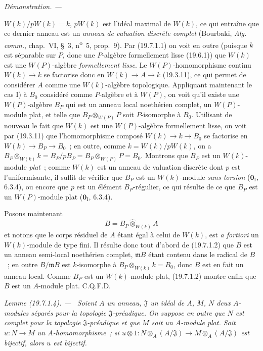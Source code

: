 \documentclass[10pt,oneside]{book}
\makeatletter
\newcommand{\setmanualcurrentlabel}[1]{\def\@currentlabel{#1}}
\newcommand{\oldpage}[2][]{%
  \setcounter{footnote}{0}%
  \marginpar{\scriptsize\textbf{#1}~|~#2}\ignorespaces}
\newenvironment{lemma}[1][]{%
  \setmanualcurrentlabel{#1}\par\medskip\noindent\itshape Lemme (#1). ---\ }{\par}
\newenvironment{proof}{%
  \par\medskip\noindent\textit{Démonstration. ---\ }}{\par}
\makeatother
\begin{document}
\begin{proof}
\oldpage[0\textsubscript{IV-1}]{107}

$W(k)/pW(k)=k$, $pW(k)$ est l'idéal maximal de $W(k)$, ce qui entraîne que ce
dernier anneau est un \emph{anneau de valuation discrète complet} (Bourbaki,
\emph{Alg. comm.}, chap.~VI, §~3, n\textsuperscript{o}~5, prop.~9). Par
(19.7.1.1) on voit en outre (puisque $k$ est séparable sur $P$, donc une
$P$-algèbre formellement lisse (19.6.1)) que $W(k)$ est une $W(P)$-algèbre
\emph{formellement lisse}. Le $W(P)$-homomorphisme continu $W(k)\to k$ se
factorise donc en $W(k)\to A\to k$ (19.3.11), ce qui permet de considérer $A$
comme une $W(k)$-algèbre topologique. Appliquant maintenant le cas I) à $B_0$
considéré comme $P$-algèbre et à $W(P)$, on voit qu'il existe une
$W(P)$-algèbre $B_P$ qui est un anneau local noethérien complet, un
$W(P)$-module plat, et telle que $B_P\otimes_{W(P)}P$ soit $P$-isomorphe à
$B_0$. Utilisant de nouveau le fait que $W(k)$ est une $W(P)$-algèbre
formellement lisse, on voit par (19.3.11) que l'homomorphisme composé
$W(k)\to k\to B_0$ se factorise en $W(k)\to B_P\to B_0$~; en outre, comme
$k=W(k)/pW(k)$, on a
$B_P\otimes_{W(k)}k=B_P/pB_P=B_P\otimes_{W(P)}P=B_0$. Montrons que $B_P$ est
un $W(k)$-module \emph{plat}~; comme $W(k)$ est un anneau de valuation discrète
dont $p$ est l'uniformisante, il suffit de vérifier que $B_P$ est un
$W(k)$-module \emph{sans torsion} ($\mathbf 0_{\mathrm I}$, 6.3.4), ou encore
que $p$ est un élément $B_P$-régulier, ce qui résulte de ce que $B_P$ est un
$W(P)$-module plat ($\mathbf 0_{\mathrm I}$, 6.3.4).

Posons maintenant
\[
  B=B_P\widehat\otimes_{W(k)}A
\]
et notons que le corps résiduel de $A$ étant égal à celui de $W(k)$, est
\emph{a fortiori} un $W(k)$-module de type fini. Il résulte donc tout d'abord
de (19.7.1.2) que $B$ est un anneau semi-local noethérien complet,
$\mathfrak mB$ étant contenu dans le radical de $B$~; en outre
$B/\mathfrak mB$ est $k$-isomorphe à
$B_P\otimes_{W(k)}k=B_0$, donc $B$ est en fait un anneau local. Comme $B_P$
est un $W(k)$-module plat, (19.7.1.2) montre enfin que $B$ est un $A$-module
plat. C.Q.F.D.
\end{proof}

\begin{lemma}[19.7.1.4]
\label{0.19.7.1.4-fr}
Soient $A$ un anneau, $\mathfrak J$ un idéal de $A$, $M$, $N$ deux $A$-modules
séparés pour la topologie $\mathfrak J$-préadique. On suppose en outre que $N$
est complet pour la topologie $\mathfrak J$-préadique et que $M$ soit un
$A$-module plat. Soit $u:N\to M$ un $A$-homomorphisme~; si
$u\otimes1:N\otimes_A(A/\mathfrak J)\to M\otimes_A(A/\mathfrak J)$ est
bijectif, alors $u$ est bijectif.
\end{lemma}
\end{document}
